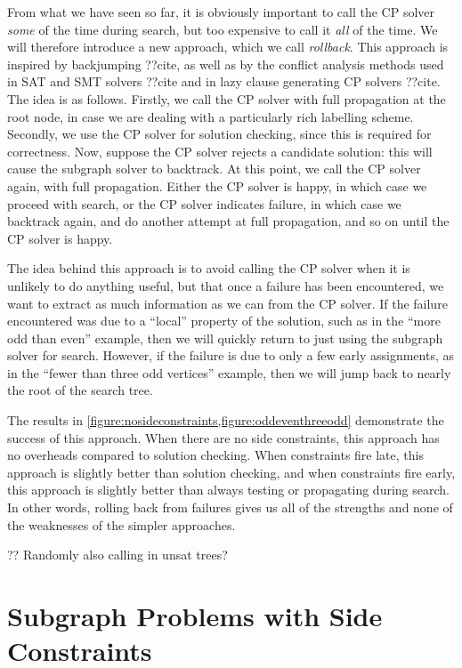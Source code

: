 \documentclass[runningheads]{llncs}
\begin{document}
From what we have seen so far, it is obviously important to call the CP solver \emph{some} of the
time during search, but too expensive to call it \emph{all} of the time. We will therefore introduce
a new approach, which we call \emph{rollback}. This approach is inspired by backjumping ??cite, as
well as by the conflict analysis methods used in SAT and SMT solvers ??cite and in lazy clause
generating CP solvers ??cite. The idea is as follows.  Firstly, we call the CP solver with full
propagation at the root node, in case we are dealing with a particularly rich labelling scheme.
Secondly, we use the CP solver for solution checking, since this is required for correctness. Now,
suppose the CP solver rejects a candidate solution: this will cause the subgraph solver to
backtrack. At this point, we call the CP solver again, with full propagation. Either the CP solver
is happy, in which case we proceed with search, or the CP solver indicates failure, in which case we
backtrack again, and do another attempt at full propagation, and so on until the CP solver is happy.

The idea behind this approach is to avoid calling the CP solver when it is unlikely to do anything
useful, but that once a failure has been encountered, we want to extract as much information as we
can from the CP solver. If the failure encountered was due to a ``local'' property of the solution,
such as in the ``more odd than even'' example, then we will quickly return to just using the
subgraph solver for search. However, if the failure is due to only a few early assignments, as in
the ``fewer than three odd vertices'' example, then we will jump back to nearly the root of the
search tree.

The results in \cref{figure:nosideconstraints,figure:oddeventhreeodd} demonstrate the
success of this approach. When there are no side constraints, this approach has no overheads
compared to solution checking. When constraints fire late, this approach is slightly better than
solution checking, and when constraints fire early, this approach is slightly better than always
testing or propagating during search. In other words, rolling back from failures gives us all of the
strengths and none of the weaknesses of the simpler approaches.

?? Randomly also calling in unsat trees?

\section{Subgraph Problems with Side Constraints}
\end{document}
